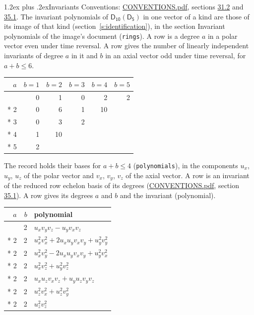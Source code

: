\documentclass[10pt,a4paper]{article}
\makeatletter
\renewcommand\section{\@startsection{section}{1}{\z@}{-3ex plus -1ex minus -.2ex}%
  {1.2ex plus .2ex}{\normalfont\large\sffamily\bfseries\color{parttitle}}}
\numberwithin{equation}{section}
\newcommand{\grp}[1]{\mathsf{#1}}
\makeatother
\begin{document}
\section{Invariants}\label{s:invariants}
Conventions: \href{../../CONVENTIONS.pdf}{CONVENTIONS.pdf}, sections \href{../../CONVENTIONS.pdf\#conv.31.2}{31.2} and \href{../../CONVENTIONS.pdf\#conv.35.1}{35.1}.
The invariant polynomials of $\grp{D_{10}}(\grp{D_{5}})$ in one vector of a kind are those of its image of that kind (section~\ref{s:identification}), in the section Invariant polynomials of the image's document (\texttt{rings}).
\leavevmode\label{n:index.degree.polar}\label{n:index.degree.axial}A row is a degree $a$ in a polar vector even under time reversal. A row gives the number of linearly independent invariants of degree $a$ in it and $b$ in an axial vector odd under time reversal, for $a + b \le 6$.
{\small\begin{longtable}{@{}rrrrrr@{}}\toprule
$a$ & $b = 1$ & $b = 2$ & $b = 3$ & $b = 4$ & $b = 5$\\\midrule\endhead
\bottomrule\endfoot\endlastfoot
1 & 0 & 1 & 0 & 2 & 2\\*
2 & 0 & 6 & 1 & 10 & \\*
3 & 0 & 3 & 2 &  & \\*
4 & 1 & 10 &  &  & \\*
5 & 2 &  &  &  & \\
\bottomrule\end{longtable}}
\leavevmode\label{n:local.component.polar}\label{n:local.component.axial}The record holds their bases for $a + b \le 4$ (\texttt{polynomials}), in the components $u_{x}$, $u_{y}$, $u_{z}$ of the polar vector and $v_{x}$, $v_{y}$, $v_{z}$ of the axial vector. \label{n:head.polynomial}A row is an invariant of the reduced row echelon basis of its degrees (\href{../../CONVENTIONS.pdf}{CONVENTIONS.pdf}, section \href{../../CONVENTIONS.pdf\#conv.35.1}{35.1}). A row gives its degrees $a$ and $b$ and the invariant (polynomial).
{\small\renewcommand{\arraystretch}{1.2}\begin{longtable}{@{}rrl@{}}\toprule
$a$ & $b$ & polynomial\\\midrule\endhead
\bottomrule\endfoot\endlastfoot
1 & 2 & $u_{x}v_{y}v_{z} - u_{y}v_{x}v_{z}$\\*
2 & 2 & $u_{x}^{2}v_{x}^{2} + 2u_{x}u_{y}v_{x}v_{y} + u_{y}^{2}v_{y}^{2}$\\*
2 & 2 & $u_{x}^{2}v_{y}^{2} - 2u_{x}u_{y}v_{x}v_{y} + u_{y}^{2}v_{x}^{2}$\\*
2 & 2 & $u_{x}^{2}v_{z}^{2} + u_{y}^{2}v_{z}^{2}$\\*
2 & 2 & $u_{x}u_{z}v_{x}v_{z} + u_{y}u_{z}v_{y}v_{z}$\\*
2 & 2 & $u_{z}^{2}v_{x}^{2} + u_{z}^{2}v_{y}^{2}$\\*
2 & 2 & $u_{z}^{2}v_{z}^{2}$\\
\bottomrule\end{longtable}}
\end{document}

